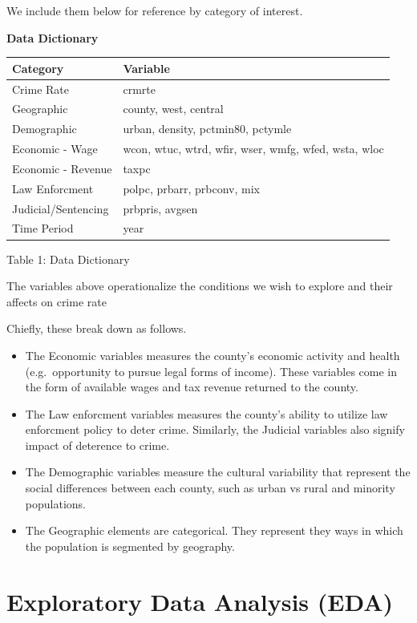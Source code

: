 \documentclass[]{article}
\begin{document}
We include them below for reference by category of interest.

\begin{center}
\textbf{Data Dictionary}
\end{center}

\begin{longtable}[]{@{}ll@{}}
\toprule
Category & Variable\tabularnewline
\midrule
\endhead
Crime Rate & crmrte\tabularnewline
Geographic & county, west, central\tabularnewline
Demographic & urban, density, pctmin80, pctymle\tabularnewline
Economic - Wage & wcon, wtuc, wtrd, wfir, wser, wmfg, wfed, wsta,
wloc\tabularnewline
Economic - Revenue & taxpc\tabularnewline
Law Enforcment & polpc, prbarr, prbconv, mix\tabularnewline
Judicial/Sentencing & prbpris, avgsen\tabularnewline
Time Period & year\tabularnewline
\bottomrule
\end{longtable}

\begin{center}
Table 1: Data Dictionary
\end{center}

The variables above operationalize the conditions we wish to explore and
their affects on crime rate

Chiefly, these break down as follows.

\begin{itemize}
\item
  The Economic variables measures the county's economic activity and
  health (e.g.~opportunity to pursue legal forms of income). These
  variables come in the form of available wages and tax revenue returned
  to the county.
\item
  The Law enforcment variables measures the county's ability to utilize
  law enforcment policy to deter crime. Similarly, the Judicial
  variables also signify impact of deterence to crime.
\item
  The Demographic variables measure the cultural variability that
  represent the social differences between each county, such as urban vs
  rural and minority populations.
\item
  The Geographic elements are categorical. They represent they ways in
  which the population is segmented by geography.
\end{itemize}

\hypertarget{exploratory-data-analysis-eda}{%
\section{Exploratory Data Analysis
(EDA)}\label{exploratory-data-analysis-eda}}
\end{document}
